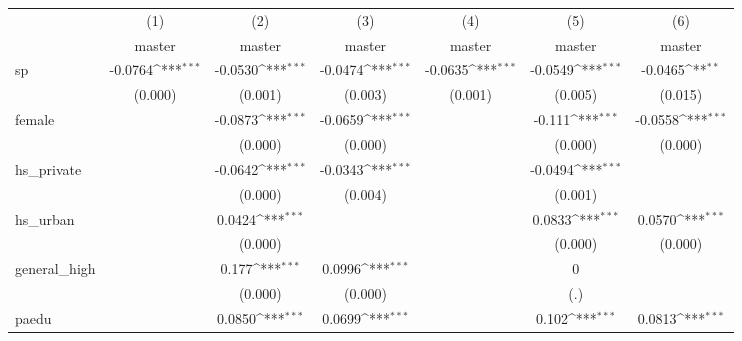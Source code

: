 {
\def\sym#1{\ifmmode^{#1}\else\(^{#1}\)\fi}
\begin{tabular}{l*{6}{c}}
\hline\hline
            &\multicolumn{1}{c}{(1)}&\multicolumn{1}{c}{(2)}&\multicolumn{1}{c}{(3)}&\multicolumn{1}{c}{(4)}&\multicolumn{1}{c}{(5)}&\multicolumn{1}{c}{(6)}\\
            &\multicolumn{1}{c}{master}&\multicolumn{1}{c}{master}&\multicolumn{1}{c}{master}&\multicolumn{1}{c}{master}&\multicolumn{1}{c}{master}&\multicolumn{1}{c}{master}\\
\hline
sp          &     -0.0764\sym{***}&     -0.0530\sym{***}&     -0.0474\sym{***}&     -0.0635\sym{***}&     -0.0549\sym{***}&     -0.0465\sym{**} \\
            &     (0.000)         &     (0.001)         &     (0.003)         &     (0.001)         &     (0.005)         &     (0.015)         \\
[1em]
female      &                     &     -0.0873\sym{***}&     -0.0659\sym{***}&                     &      -0.111\sym{***}&     -0.0558\sym{***}\\
            &                     &     (0.000)         &     (0.000)         &                     &     (0.000)         &     (0.000)         \\
[1em]
hs\_private  &                     &     -0.0642\sym{***}&     -0.0343\sym{***}&                     &     -0.0494\sym{***}&                     \\
            &                     &     (0.000)         &     (0.004)         &                     &     (0.001)         &                     \\
[1em]
hs\_urban    &                     &      0.0424\sym{***}&                     &                     &      0.0833\sym{***}&      0.0570\sym{***}\\
            &                     &     (0.000)         &                     &                     &     (0.000)         &     (0.000)         \\
[1em]
general\_high&                     &       0.177\sym{***}&      0.0996\sym{***}&                     &           0         &                     \\
            &                     &     (0.000)         &     (0.000)         &                     &         (.)         &                     \\
[1em]
paedu       &                     &      0.0850\sym{***}&      0.0699\sym{***}&                     &       0.102\sym{***}&      0.0813\sym{***}\\

\end{tabular}}
